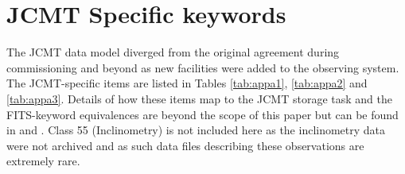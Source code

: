 \documentclass[final,authoryear,5p,times,twocolumn]{elsarticle}
\begin{document}


\appendix

\section{JCMT Specific keywords}
\label{app:jcmt}

The JCMT data model diverged from the original agreement during
commissioning and beyond as new facilities were added to the observing
system. The JCMT-specific items are listed in Tables \ref{tab:appa1},
\ref{tab:appa2} and \ref{tab:appa3}. Details of how these items map to
the JCMT storage task and the FITS-keyword equivalences are beyond the
scope of this paper but can be found in \citet{mtdn85} and
\citet{SUN229}. Class 55 (Inclinometry) is not included here as the
inclinometry data were not archived and as such data files describing
these observations are extremely rare.
\end{document}
